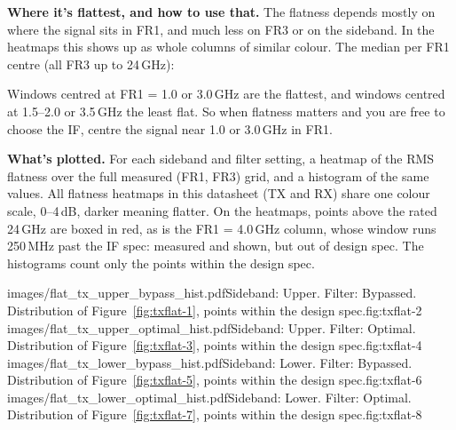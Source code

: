 \textbf{Where it's flattest, and how to use that.} The flatness depends mostly on where the signal sits in FR1, and
much less on FR3 or on the sideband. In the heatmaps this shows up as whole columns of similar colour. The median per
FR1 centre (all FR3 up to 24\,GHz):
\par\medskip\noindent\begin{minipage}{\linewidth}%
\begin{center}
\label{tab:txflat-by-fr1}
\vspace{0.4em}
\footnotesize

\end{center}
\end{minipage}\par
Windows centred at FR1 = 1.0 or 3.0\,GHz are the flattest, and windows centred at 1.5--2.0 or 3.5\,GHz the least
flat. So when flatness matters and you are free to choose the IF, centre the signal near 1.0 or 3.0\,GHz in FR1.

\textbf{What's plotted.} For each sideband and filter setting, a heatmap of the RMS flatness over the full measured
(FR1, FR3) grid, and a histogram of the same values. All flatness heatmaps in this datasheet (TX and RX) share one
colour scale, 0--4\,dB, darker meaning flatter. On the heatmaps, points above the rated 24\,GHz are boxed in red, as
is the FR1 = 4.0\,GHz column, whose window runs 250\,MHz past the IF spec: measured and shown, but out of design
spec. The histograms count only the points within the design spec.

%
        {images/flat_tx_upper_bypass_hist.pdf}{Sideband: Upper. Filter: Bypassed. Distribution of
Figure~\ref{fig:txflat-1}, points within the design spec.}{fig:txflat-2}
%
        {images/flat_tx_upper_optimal_hist.pdf}{Sideband: Upper. Filter: Optimal. Distribution of
Figure~\ref{fig:txflat-3}, points within the design spec.}{fig:txflat-4}
\clearpage
{}%
        {images/flat_tx_lower_bypass_hist.pdf}{Sideband: Lower. Filter: Bypassed. Distribution of
Figure~\ref{fig:txflat-5}, points within the design spec.}{fig:txflat-6}
%
        {images/flat_tx_lower_optimal_hist.pdf}{Sideband: Lower. Filter: Optimal. Distribution of
Figure~\ref{fig:txflat-7}, points within the design spec.}{fig:txflat-8}
\flushbottom
